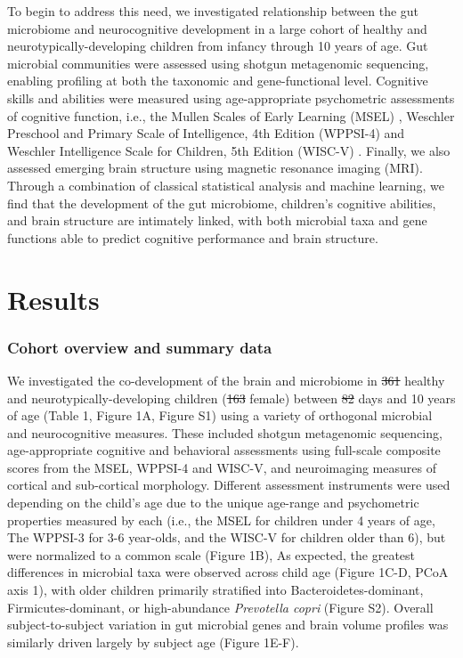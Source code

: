\documentclass{article}
\providecommand{\DIFadd}[1]{{\protect\color{blue}\uwave{#1}}} %
\providecommand{\DIFdel}[1]{{\protect\color{red}\sout{#1}}}                      %
\providecommand{\DIFaddbegin}{} %
\providecommand{\DIFaddend}{} %
\providecommand{\DIFdelbegin}{} %
\providecommand{\DIFdelend}{} %
\newcommand{\DIFscaledelfig}{0.5}
\newlength{\DIFdelgraphicswidth} %
\newlength{\DIFdelgraphicsheight} %
\newcommand{\DIFaddincludegraphics}[2][]{{\color{blue}\fbox{\DIFOincludegraphics[#1]{#2}}}} %
\newcommand{\DIFdelincludegraphics}[2][]{%
\sbox{\DIFdelgraphicsbox}{\DIFOincludegraphics[#1]{#2}}%
\settoboxwidth{\DIFdelgraphicswidth}{\DIFdelgraphicsbox} %
\settoboxtotalheight{\DIFdelgraphicsheight}{\DIFdelgraphicsbox} %
\scalebox{\DIFscaledelfig}{%
\parbox[b]{\DIFdelgraphicswidth}{\usebox{\DIFdelgraphicsbox}\\[-\baselineskip] \rule{\DIFdelgraphicswidth}{0em}}\llap{\resizebox{\DIFdelgraphicswidth}{\DIFdelgraphicsheight}{%
\setlength{\unitlength}{\DIFdelgraphicswidth}%
\begin{picture}(1,1)%
\thicklines\linethickness{2pt} %
{\color[rgb]{1,0,0}\put(0,0){\framebox(1,1){}}}%
{\color[rgb]{1,0,0}\put(0,0){\line( 1,1){1}}}%
{\color[rgb]{1,0,0}\put(0,1){\line(1,-1){1}}}%
\end{picture}%
}\hspace*{3pt}}} %
} %
\DeclareRobustCommand{\DIFaddbegin}{\DIFOaddbegin \let\includegraphics\DIFaddincludegraphics} %
\DeclareRobustCommand{\DIFaddend}{\DIFOaddend \let\includegraphics\DIFOincludegraphics} %
\DeclareRobustCommand{\DIFdelbegin}{\DIFOdelbegin \let\includegraphics\DIFdelincludegraphics} %
\DeclareRobustCommand{\DIFdelend}{\DIFOaddend \let\includegraphics\DIFOincludegraphics} %
\begin{document}
To begin to address this need, we investigated relationship between
the gut microbiome and
neurocognitive development in a large cohort of healthy and neurotypically-developing
children from infancy through 10 years of age. Gut microbial
communities were assessed using shotgun metagenomic sequencing, enabling
profiling at both the taxonomic and gene-functional level.
Cognitive skills and abilities were measured using age-appropriate
psychometric assessments of cognitive function, i.e.,
the Mullen Scales of Early Learning (MSEL) \cite{mullenMullenScalesEarly1995},
Weschler Preschool and Primary Scale of Intelligence, 4th Edition (WPPSI-4) 
\cite{wechslerWechslerPreschoolPrimary2012}
and Weschler Intelligence Scale for Children, 5th Edition (WISC-V)
\cite{wechslerWechslerIntelligenceScale1949}.
Finally, we also assessed emerging brain structure using magnetic resonance imaging
(MRI). Through a combination of classical statistical analysis and machine
learning, we find that the development of the gut microbiome,
children's cognitive abilities, and brain structure are intimately linked, with
both microbial taxa and gene functions able to predict cognitive
performance and brain structure.

\section*{Results}

\subsubsection*{Cohort overview and summary data}

We investigated the co-development of the brain and microbiome in
\DIFdelbegin \DIFdel{361 }\DIFdelend \DIFaddbegin \DIFadd{381 }\DIFaddend healthy and neurotypically-developing children (\DIFdelbegin \DIFdel{163 }\DIFdelend \DIFaddbegin \DIFadd{172 }\DIFaddend female) between \DIFdelbegin \DIFdel{82 }\DIFdelend \DIFaddbegin \DIFadd{40 }\DIFaddend days and 10 years of age
(Table 1,  Figure 1A, Figure S1)
using a variety of orthogonal microbial and neurocognitive measures.
These included shotgun metagenomic sequencing,
age-appropriate cognitive and behavioral assessments
using full-scale composite scores from the MSEL, WPPSI-4 and WISC-V,
and neuroimaging measures of cortical and sub-cortical morphology. 
Different assessment instruments were used depending on the child's age
due to the unique age-range and psychometric properties measured by each
(i.e., the MSEL for children under 4 years of age, The WPPSI-3 for 3-6 year-olds,
and the WISC-V for children older than 6), but were normalized to a common scale (Figure 1B),
As expected, the greatest differences in microbial taxa were observed across
child age (Figure 1C-D, PCoA axis 1), with older children primarily
stratified into Bacteroidetes-dominant, Firmicutes-dominant, or
high-abundance \emph{Prevotella copri} (Figure S2).
Overall subject-to-subject variation in gut microbial genes
and brain volume profiles was similarly driven largely by subject age (Figure 1E-F).
\end{document}
